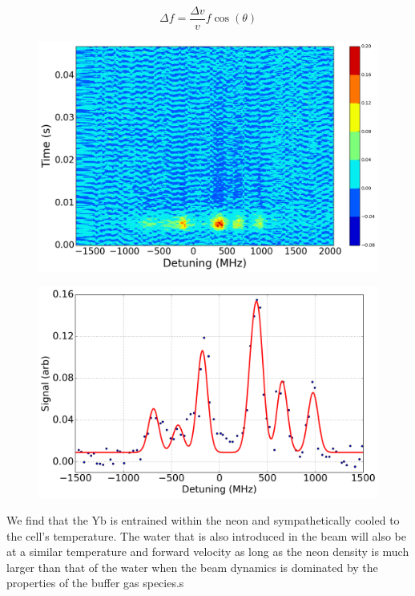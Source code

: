 \begin{equation}
	\Delta f = \frac{\Delta v}{v} f \cos(\theta)
\end{equation}

\begin{figure}[H]
\end{figure}

\begin{figure}[H]
	\centering
	\includegraphics[width=1\textwidth]{images/CBGB_Yb_spectrum_scan.png}
	\caption{}
	\label{fig: yb_spectrum_scan}
\end{figure}

\begin{figure}[H]
	\centering
	\includegraphics[width=1\textwidth]{images/CBGB_Yb_spectrum_long.png}
	\caption{}
	\label{fig: yb_spectrum}
\end{figure}

We find that the Yb is entrained within the neon and sympathetically cooled to the cell's temperature. The water that is also introduced in the beam will also be at a similar temperature and forward velocity as long as the neon density is much larger than that of the water when the beam dynamics is dominated by the properties of the buffer gas species.s
